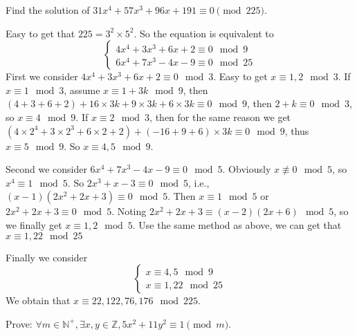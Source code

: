 \documentclass{ctexart}
\begin{document}
\begin{problem}\label{pro:2}
  Find the solution of \(31x^4 + 57x^3 + 96x + 191 \equiv 0 \pmod{ 225}\).
\end{problem}
\begin{solution}
  Easy to get that \(225 = 3^2 \times 5^2\).
  So the equation is equivalent to
  \[
    \begin{cases}
      4 x^4+3x^3+6x+2 \equiv 0 \mod 9 \\
      6 x^4 + 7 x^3 -4x-9 \equiv 0 \mod 25
    \end{cases}
  \]
  First we consider \(4x^4+3x^3+6x+2 \equiv 0 \mod 3\).
  Easy to get \(x \equiv 1,2 \mod 3\).
  If \(x \equiv 1 \mod 3\), assume \(x \equiv 1+3k \mod 9\), then \((4+3+6+2)+16 \times 3k + 9 \times 3k + 6 \times 3k \equiv 0 \mod 9\),
  then \(2+k \equiv 0 \mod 3\), so \(x \equiv 4 \mod 9\).
  If \(x \equiv 2 \mod 3\), then for the same reason we get \((4\times 2^4+3\times 2^3+6\times 2+2)+(-16+9+6)\times 3k \equiv 0 \mod 9\),
  thus \(x \equiv 5 \mod 9\). So \(x \equiv 4,5 \mod 9\).

  Second we consider \(6 x^4 + 7 x^3 -4x-9 \equiv 0 \mod 5\). Obviously \(x \not \equiv 0 \mod 5\), so \(x^4 \equiv 1 \mod 5\).
  So \(2x^3+x-3 \equiv 0 \mod 5\), i.e., \((x-1)(2x^2+2x+3) \equiv 0 \mod 5\). Then \(x \equiv 1 \mod 5\) or \(2x^2+2x+3 \equiv 0 \mod 5\).
  Noting \(2x^2+2x+3 \equiv (x-2)(2x+6) \mod 5\), so we finally get \(x \equiv 1,2 \mod 5\).
  Use the same method as above, we can get that \(x \equiv 1,22 \mod 25\)

  Finally we consider
  \[
    \begin{cases}
      x \equiv 4,5 \mod 9 \\
      x \equiv 1,22 \mod 25
    \end{cases}
  \]
  We obtain that \(x \equiv 22,122,76,176 \mod 225\).
\end{solution}
\begin{problem}\label{pro:3}
  Prove: \(\forall m \in \mathbb{N}^+,\exists x,y \in \mathbb{Z},5x^2 + 11y^2 \equiv 1 \pmod{ m}\).
\end{problem}
\end{document}
